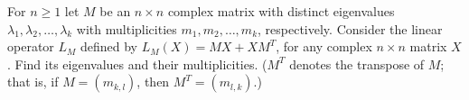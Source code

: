 \documentclass{article}
\begin{document}
\setlength{\parindent}{0pt}
For $n\ge1$ let $M$ be an $n\times n$ complex matrix with distinct eigenvalues $\lambda_{1},\lambda_{2},\dots,\lambda_{k}$ with multiplicities $m_{1},m_{2},\dots,m_{k}$, respectively. Consider the linear operator $L_{M}$ defined by $L_{M}(X)=MX+XM^{T}$, for any complex $n\times n$ matrix $X$. Find its eigenvalues and their multiplicities. ($M^{T}$ denotes the transpose of $M$; that is, if $M=(m_{k,l})$, then $M^{T}=(m_{l,k})$.)
\end{document}
